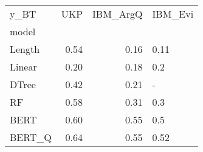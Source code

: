 \begin{tabular}{lrrl}
\toprule
y\_BT &   UKP &  IBM\_ArgQ & IBM\_Evi \\
model  &       &           &         \\
\midrule
Length &  0.54 &      0.16 &    0.11 \\
Linear &  0.20 &      0.18 &     0.2 \\
DTree  &  0.42 &      0.21 &       - \\
RF     &  0.58 &      0.31 &     0.3 \\
BERT   &  0.60 &      0.55 &     0.5 \\
BERT\_Q &  0.64 &      0.55 &    0.52 \\
\bottomrule
\end{tabular}
